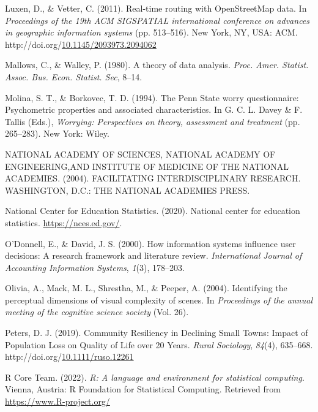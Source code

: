 \documentclass[print]{nuthesis}
\newlength{\cslhangindent}
\newenvironment{CSLReferences}[2]%
{\setlength{\parindent}{0pt}%
\everypar{\setlength{\hangindent}{\cslhangindent}}\ignorespaces}%
{\par}
\begin{document}
\begin{CSLReferences}{1}{0}
\leavevmode\hypertarget{ref-luxen-vetter-2011}{}%
Luxen, D., \& Vetter, C. (2011). Real-time routing with OpenStreetMap data. In \emph{Proceedings of the 19th ACM SIGSPATIAL international conference on advances in geographic information systems} (pp. 513--516). New York, NY, USA: ACM. http://doi.org/\href{https://doi.org/10.1145/2093973.2094062}{10.1145/2093973.2094062}

\leavevmode\hypertarget{ref-mallows1980}{}%
Mallows, C., \& Walley, P. (1980). A theory of data analysis. \emph{Proc. Amer. Statist. Assoc. Bus. Econ. Statist. Sec}, 8--14.

\leavevmode\hypertarget{ref-Molina1994}{}%
Molina, S. T., \& Borkovec, T. D. (1994). The {P}enn {S}tate worry questionnaire: Psychometric properties and associated characteristics. In G. C. L. Davey \& F. Tallis (Eds.), \emph{Worrying: Perspectives on theory, assessment and treatment} (pp. 265--283). New York: Wiley.

\leavevmode\hypertarget{ref-NATIONALACADEMYOFSCIENCES}{}%
NATIONAL ACADEMY OF SCIENCES, NATIONAL ACADEMY OF ENGINEERING,AND INSTITUTE OF MEDICINE OF THE NATIONAL ACADEMIES. (2004). FACILITATING INTERDISCIPLINARY RESEARCH. WASHINGTON, D.C.: THE NATIONAL ACADEMIES PRESS.

\leavevmode\hypertarget{ref-elsi}{}%
National Center for Education Statistics. (2020). National center for education statistics. \url{https://nces.ed.gov/}.

\leavevmode\hypertarget{ref-odonnell2000}{}%
O'Donnell, E., \& David, J. S. (2000). How information systems influence user decisions: A research framework and literature review. \emph{International Journal of Accounting Information Systems}, \emph{1}(3), 178--203.

\leavevmode\hypertarget{ref-olivia2004}{}%
Olivia, A., Mack, M. L., Shrestha, M., \& Peeper, A. (2004). Identifying the perceptual dimensions of visual complexity of scenes. In \emph{Proceedings of the annual meeting of the cognitive science society} (Vol. 26).

\leavevmode\hypertarget{ref-petersCommunityResiliencyDeclining2019}{}%
Peters, D. J. (2019). Community {Resiliency} in {Declining} {Small} {Towns}: {Impact} of {Population} {Loss} on {Quality} of {Life} over 20 {Years}. \emph{Rural Sociology}, \emph{84}(4), 635--668. http://doi.org/\href{https://doi.org/10.1111/ruso.12261}{10.1111/ruso.12261}

\leavevmode\hypertarget{ref-r}{}%
R Core Team. (2022). \emph{R: A language and environment for statistical computing}. Vienna, Austria: R Foundation for Statistical Computing. Retrieved from \url{https://www.R-project.org/}


\end{CSLReferences}
\end{document}
